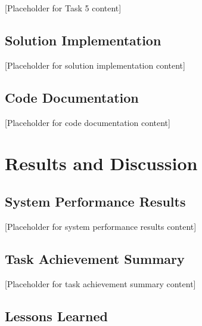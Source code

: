 \documentclass[12pt,a4paper]{article}
\begin{document}
[Placeholder for Task 5 content]


\subsection{Solution Implementation}


[Placeholder for solution implementation content]

\subsection{Code Documentation}


[Placeholder for code documentation content]

\section{Results and Discussion}


\subsection{System Performance Results}


[Placeholder for system performance results content]

\subsection{Task Achievement Summary}


[Placeholder for task achievement summary content]

\subsection{Lessons Learned}
\end{document}
